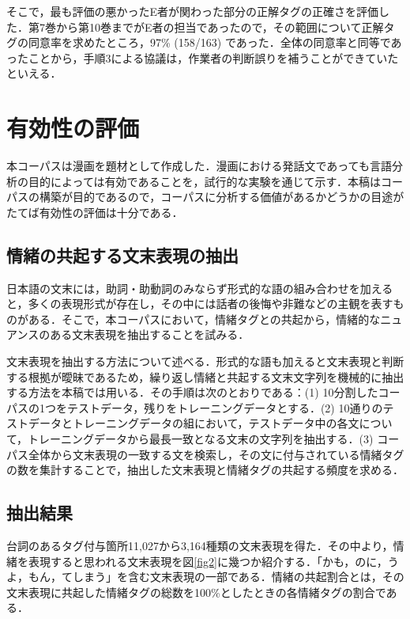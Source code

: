 \documentclass[japanese]{jnlp_1.3c}
\begin{document}
そこで，最も評価の悪かったE者が関わった部分の正解タグの正確さを評価した．第7巻から第10巻までがE者の担当であったので，その範囲について正解タグの同意率を求めたところ，97\% (158/163) であった．全体の同意率と同等であったことから，手順3による協議は，作業者の判断誤りを補うことができていたといえる．



\section{有効性の評価}

本コーパスは漫画を題材として作成した．漫画における発話文であっても言語分析の目的によっては有効であることを，試行的な実験を通じて示す．本稿はコーパスの構築が目的であるので，コーパスに分析する価値があるかどうかの目途がたてば有効性の評価は十分である．

\subsection{情緒の共起する文末表現の抽出}

日本語の文末には，助詞・助動詞のみならず形式的な語の組み合わせを加えると，多くの表現形式が存在し，その中には話者の後悔や非難などの主観を表すものがある．そこで，本コーパスにおいて，情緒タグとの共起から，情緒的なニュアンスのある文末表現を抽出することを試みる．

文末表現を抽出する方法について述べる．形式的な語も加えると文末表現と判断する根拠が曖昧であるため，繰り返し情緒と共起する文末文字列を機械的に抽出する方法を本稿では用いる．その手順は次のとおりである：(1) 10分割したコーパスの1つをテストデータ，残りをトレーニングデータとする．(2) 10通りのテストデータとトレーニングデータの組において，テストデータ中の各文について，トレーニングデータから最長一致となる文末の文字列を抽出する．(3) コーパス全体から文末表現の一致する文を検索し，その文に付与されている情緒タグの数を集計することで，抽出した文末表現と情緒タグの共起する頻度を求める．

\subsection{抽出結果}

台詞のあるタグ付与箇所11,027から3,164種類の文末表現を得た．その中より，情緒を表現すると思われる文末表現を図\ref{fig2}に幾つか紹介する．「かも，のに，うよ，もん，てしまう」を含む文末表現の一部である．情緒の共起割合とは，その文末表現に共起した情緒タグの総数を100\%としたときの各情緒タグの割合である．
\end{document}
